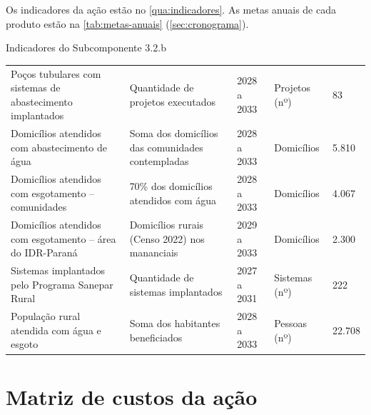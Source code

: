 Os indicadores da ação estão no \autoref{qua:indicadores}. As metas anuais de
cada produto estão na \autoref{tab:metas-anuais} (\autoref{sec:cronograma}).

\begin{quadro}[H]
\caption{Indicadores do Subcomponente 3.2.b}
\label{qua:indicadores}
\footnotesize
\renewcommand{\arraystretch}{1.25}
\begin{tabularx}{\textwidth}{|L|L|Q{1.6cm}|P{2.2cm}|Q{1.4cm}|}
\hline
{} &  &  &
 &  \\ \hline
Poços tubulares com sistemas de abastecimento implantados &
Quantidade de projetos executados & 2028 a 2033 & Projetos (nº) & 83 \\ \hline
Domicílios atendidos com abastecimento de água &
Soma dos domicílios das comunidades contempladas & 2028 a 2033 & Domicílios & 5.810 \\ \hline
Domicílios atendidos com esgotamento -- comunidades &
70\% dos domicílios atendidos com água & 2028 a 2033 & Domicílios & 4.067 \\ \hline
Domicílios atendidos com esgotamento -- área do IDR-Paraná &
Domicílios rurais (Censo 2022) nos mananciais & 2029 a 2033 & Domicílios & 2.300 \\ \hline
Sistemas implantados pelo Programa Sanepar Rural &
Quantidade de sistemas implantados & 2027 a 2031 & Sistemas (nº) & 222 \\ \hline
População rural atendida com água e esgoto &
Soma dos habitantes beneficiados & 2028 a 2033 & Pessoas (nº) & 22.708 \\ \hline
\end{tabularx}
\end{quadro}


\FloatBarrier
\section{Matriz de custos da ação}
\label{sec:custos}

